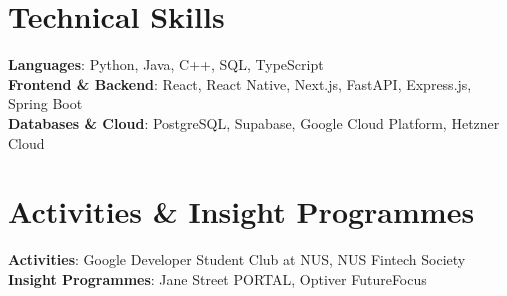 \documentclass[letterpaper,11pt]{article}
\begin{document}
\section{Technical Skills}
 \begin{itemize}[leftmargin=0.15in, label={}]
    \small{\item{
     \textbf{Languages}{: Python, Java, C++, SQL, TypeScript} \\
     \textbf{Frontend \& Backend}{: React, React Native, Next.js, FastAPI, Express.js, Spring Boot} \\
     \textbf{Databases \& Cloud}{: PostgreSQL, Supabase, Google Cloud Platform, Hetzner Cloud}
    }}
 \end{itemize}


\section{Activities \& Insight Programmes}
 \begin{itemize}[leftmargin=0.15in, label={}]
    \small{\item{
     \textbf{Activities}{: Google Developer Student Club at NUS, NUS Fintech Society} \\
     \textbf{Insight Programmes}{: Jane Street PORTAL, Optiver FutureFocus}
    }}
 \end{itemize}
\end{document}
